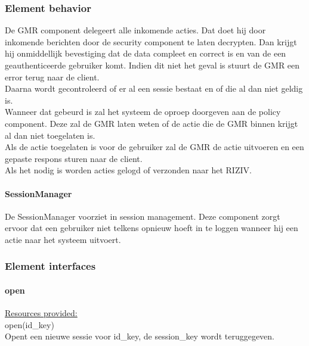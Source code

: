 \documentclass[a4paper,10pt]{article}
\begin{document}
\subsubsection{Element behavior}
De GMR component delegeert alle inkomende acties.  Dat doet hij door inkomende berichten door de security component te laten decrypten.  Dan krijgt hij onmiddellijk bevestiging dat de data compleet en correct is en van de een geauthenticeerde gebruiker komt.  Indien dit niet het geval is stuurt de GMR een error terug naar de client.\\
Daarna wordt gecontroleerd of er al een sessie bestaat en of die al dan niet geldig is.\\
Wanneer dat gebeurd is zal het systeem de oproep doorgeven aan de policy component.  Deze zal de GMR laten weten of de actie die de GMR binnen krijgt al dan niet toegelaten is.\\
Als de actie toegelaten is voor de gebruiker zal de GMR de actie uitvoeren en een gepaste respons sturen naar de client.\\
Als het nodig is worden acties gelogd of verzonden naar het RIZIV.\\

\paragraph{SessionManager}
De SessionManager voorziet in session management.  Deze component zorgt ervoor dat een gebruiker niet telkens opnieuw hoeft in te loggen wanneer hij een actie naar het systeem uitvoert.

\subsubsection{Element interfaces} 

\paragraph{open}
\underline{Resources provided:}\\
open(id\_key)\\
Opent een nieuwe sessie voor id\_key, de session\_key wordt teruggegeven.
\end{document}
